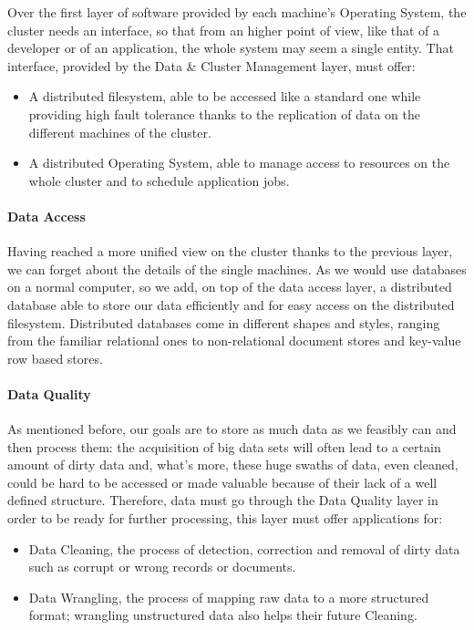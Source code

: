 Over the first layer of software provided by each machine's Operating System, the cluster needs an interface, so that from an higher point of view, like that of a developer or of an application, the whole system may seem a single entity. \newline
That interface, provided by the Data \& Cluster Management layer, must offer: 
\begin{itemize}
	\item A distributed filesystem, able to be accessed like a standard one while providing high fault tolerance thanks to the replication of data on the different machines of the cluster.
	\item A distributed Operating System, able to manage access to resources on the whole cluster and to schedule application jobs.
\end{itemize}

\paragraph{Data Access}

Having reached a more unified view on the cluster thanks to the previous layer, we can forget about the details of the single machines.\newline
As we would use databases on a normal computer, so we add, on top of the data access layer, a distributed database able to store our data efficiently and for easy access on the distributed filesystem.
Distributed databases come in different shapes and styles, ranging from the familiar relational ones to non-relational document stores and key-value row based stores.

\paragraph{Data Quality}

As mentioned before, our goals are to store as much data as we feasibly can and then process them: the acquisition of big data sets will often lead to a certain amount of dirty data and, what’s more, these huge swaths of data, even cleaned, could be hard to be accessed or made valuable because of their lack of a well defined structure.
\newline
Therefore, data must go through the Data Quality layer in order to be ready for further processing, this layer must offer applications for:
\begin{itemize}
	\item Data Cleaning, the process of detection, correction and removal of dirty data such as corrupt or wrong records or documents.
	\item Data Wrangling, the process of mapping raw data to a more structured format; wrangling unstructured data also helps their future Cleaning.
\end{itemize}

